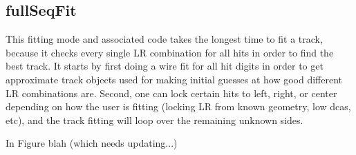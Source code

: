       \subsection{fullSeqFit}

      This fitting mode and associated code takes the longest time to fit a track, because it checks every single LR combination for all hits in order to find the best track. It starts by first doing a wire fit for all hit digits in order to get approximate track objects used for making initial guesses at how good different LR combinations are. Second, one can lock certain hits to left, right, or center depending on how the user is fitting (locking LR from known geometry, low dcas, etc), and the track fitting will loop over the remaining unknown sides.

      In Figure blah (which needs updating...)
